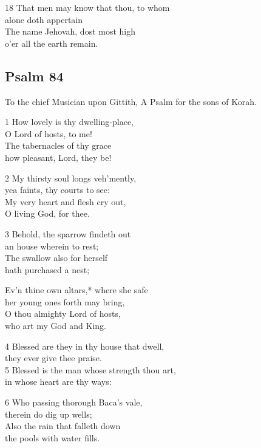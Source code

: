 18 That men may know that thou, to whom\\
alone doth appertain\\
The name Jehovah, dost most high\\
o’er all the earth remain.

\begin{center}
\quad{}\quad{}
\end{center}

\subsection*{Psalm 84}

To the chief Musician upon Gittith,
A Psalm for the sons of Korah.

1 How lovely is thy dwelling-place,\\
O Lord of hosts, to me!\\
The tabernacles of thy grace\\
how pleasant, Lord, they be!

2 My thirsty soul longs veh’mently,\\
yea faints, thy courts to see:\\
My very heart and flesh cry out,\\
O living God, for thee.

3 Behold, the sparrow findeth out\\
an house wherein to rest;\\
The swallow also for herself\\
hath purchased a nest;

Ev’n thine own altars,* where she safe\\
her young ones forth may bring,\\
O thou almighty Lord of hosts,\\
who art my God and King.

4 Blessed are they in thy house that dwell,\\
they ever give thee praise.\\
5 Blessed is the man whose strength thou art,\\
in whose heart are thy ways:

6 Who passing thorough Baca’s vale,\\
therein do dig up wells;\\
Also the rain that falleth down\\
the pools with water fills.

